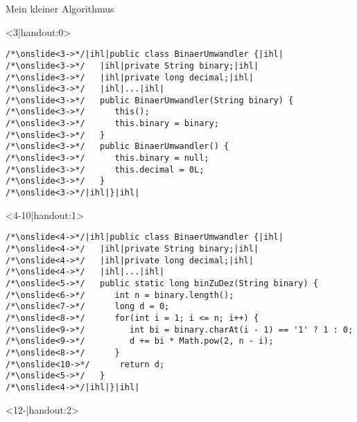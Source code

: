 {\SidebarSolution
\begin{frame}[fragile,c]{Mein kleiner Algorithmus}
\medskip
\SetupLstHl
{}
\begin{onlyenv}<3|handout:0>
\begin{verbatim}
/*\onslide<3->*/|ihl|public class BinaerUmwandler {|ihl|
/*\onslide<3->*/   |ihl|private String binary;|ihl|
/*\onslide<3->*/   |ihl|private long decimal;|ihl|
/*\onslide<3->*/   |ihl|...|ihl|
/*\onslide<3->*/   public BinaerUmwandler(String binary) {
/*\onslide<3->*/      this();
/*\onslide<3->*/      this.binary = binary;
/*\onslide<3->*/   }
/*\onslide<3->*/   public BinaerUmwandler() {
/*\onslide<3->*/      this.binary = null;
/*\onslide<3->*/      this.decimal = 0L;
/*\onslide<3->*/   }
/*\onslide<3->*/|ihl|}|ihl|
\end{verbatim}
\end{onlyenv}
\begin{onlyenv}<4-10|handout:1>
\begin{verbatim}
/*\onslide<4->*/|ihl|public class BinaerUmwandler {|ihl|
/*\onslide<4->*/   |ihl|private String binary;|ihl|
/*\onslide<4->*/   |ihl|private long decimal;|ihl|
/*\onslide<4->*/   |ihl|...|ihl|
/*\onslide<5->*/   public static long binZuDez(String binary) {
/*\onslide<6->*/      int n = binary.length();
/*\onslide<7->*/      long d = 0;
/*\onslide<8->*/      for(int i = 1; i <= n; i++) {
/*\onslide<9->*/         int bi = binary.charAt(i - 1) == '1' ? 1 : 0;
/*\onslide<9->*/         d += bi * Math.pow(2, n - i);
/*\onslide<8->*/      }
/*\onslide<10->*/      return d;
/*\onslide<5->*/   }
/*\onslide<4->*/|ihl|}|ihl|
\end{verbatim}
\end{onlyenv}
\begin{onlyenv}<12-|handout:2>

\end{onlyenv}
\end{frame}}
